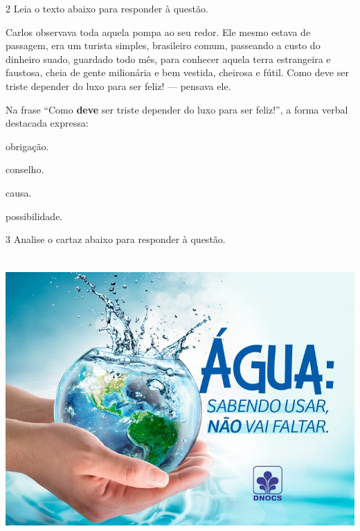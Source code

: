 \num{2} Leia o texto abaixo para responder à questão. 

\begin{myquote}

Carlos observava toda aquela pompa ao seu redor. Ele mesmo estava de passagem,
era um turista simples, brasileiro comum, passeando a custo do dinheiro suado, 
guardado todo mês, para conhecer aquela terra estrangeira e faustosa, cheia de 
gente milionária e bem vestida, cheirosa e fútil. Como deve ser triste depender
do luxo para ser feliz! --- pensava ele.


\end{myquote}

Na frase ``Como \textbf{deve} ser triste depender do luxo para ser feliz!'', 
a forma verbal destacada expressa:

\begin{escolha}
  
  \item obrigação.
  
  \item conselho.
  
  \item causa.
  
  \item possibilidade.

\end{escolha}

\num{3} Analise o cartaz abaixo para responder à questão.


\includegraphics[width=5.90551in,height=4.29167in]{./imgSAEB_7_POR/media/image13.png}

